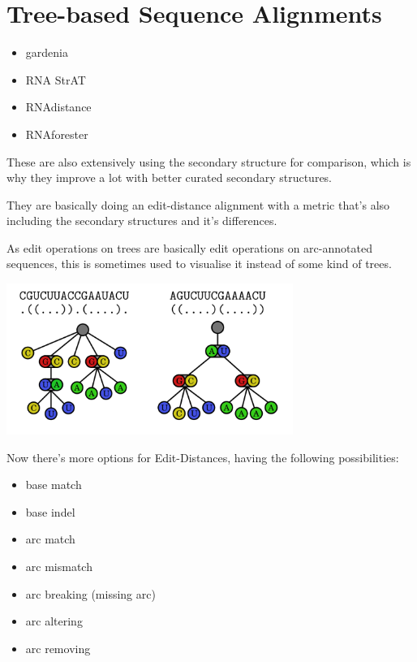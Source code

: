 \documentclass{scrartcl}
\begin{document}
\newpage

\section*{Tree-based Sequence Alignments}

\begin{itemize}
\item gardenia
\item RNA StrAT
\item RNAdistance
\item RNAforester
\end{itemize}

These are also extensively using the secondary structure for comparison, which
is why they improve a lot with better curated secondary structures.

They are basically doing an edit-distance alignment with a metric that's also
including the secondary structures and it's differences.

As edit operations on trees are basically edit operations on arc-annotated
sequences, this is sometimes used to visualise it instead of some kind of
trees.


\includegraphics[width=0.7\textwidth]{bioinfII/images/tree_sequences}

Now there's more options for Edit-Distances, having the following
possibilities:
\begin{multicols}{2}
\begin{itemize}
    \item base match
    \item base indel
    \item arc match
    \item arc mismatch
    \item arc breaking (missing arc)
    \item arc altering
    \item arc removing
\end{itemize}
\end{multicols}
\end{document}
